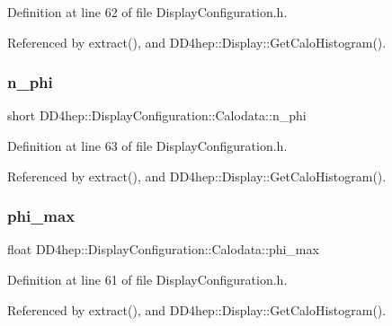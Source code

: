 Definition at line 62 of file Display\+Configuration.\+h.



Referenced by extract(), and D\+D4hep\+::\+Display\+::\+Get\+Calo\+Histogram().

\hypertarget{struct_d_d4hep_1_1_display_configuration_1_1_calodata_a30fd6c2e98b91f76c020d803c0cf10fd}{}\label{struct_d_d4hep_1_1_display_configuration_1_1_calodata_a30fd6c2e98b91f76c020d803c0cf10fd} 
\subsubsection{\texorpdfstring{n\+\_\+phi}{n\_phi}}
{\footnotesize\ttfamily short D\+D4hep\+::\+Display\+Configuration\+::\+Calodata\+::n\+\_\+phi}



Definition at line 63 of file Display\+Configuration.\+h.



Referenced by extract(), and D\+D4hep\+::\+Display\+::\+Get\+Calo\+Histogram().

\hypertarget{struct_d_d4hep_1_1_display_configuration_1_1_calodata_ae0666a2af1e429c873b335c99545ad21}{}\label{struct_d_d4hep_1_1_display_configuration_1_1_calodata_ae0666a2af1e429c873b335c99545ad21} 
\subsubsection{\texorpdfstring{phi\+\_\+max}{phi\_max}}
{\footnotesize\ttfamily float D\+D4hep\+::\+Display\+Configuration\+::\+Calodata\+::phi\+\_\+max}



Definition at line 61 of file Display\+Configuration.\+h.



Referenced by extract(), and D\+D4hep\+::\+Display\+::\+Get\+Calo\+Histogram().

\hypertarget{struct_d_d4hep_1_1_display_configuration_1_1_calodata_ab35d557de81c5fe8dbfecefda9e83cfb}{}\label{struct_d_d4hep_1_1_display_configuration_1_1_calodata_ab35d557de81c5fe8dbfecefda9e83cfb} 
